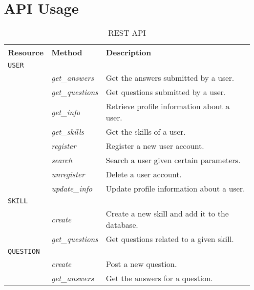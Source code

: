 \chapter{API Usage}

\begin{table}
	\caption{REST API}\label{table:rest_api}
	
	\begin{center}
		\begin{tabular}{p{70px} | p{70px} | p{210px}}
				\hline
				\hline
				\textbf{Resource} 		& \textbf{Method}					&	\textbf{Description} 	\\
				\hline
				\hline
				\texttt{USER}					&	\\
				\hline
															& \emph{get\_answers}			& Get the answers submitted by a user. \\
															& \emph{get\_questions}		& Get questions submitted by a user. \\
															& \emph{get\_info}				&	Retrieve profile information about a user.	\\
															& \emph{get\_skills}			& Get the skills of a user. \\
															& \emph{register}					&	Register a new user account. \\
															& \emph{search}						&	Search a user given certain parameters. \\
															& \emph{unregister}				&	Delete a user account. \\
															& \emph{update\_info}			& Update profile information about a user. \\
				\hline
				\texttt{SKILL}				& 												& \\
				\hline
															& \emph{create}						& Create a new skill and add it to the database. \\
															& \emph{get\_questions}		& Get questions related to a given skill. \\
				\hline
				\texttt{QUESTION}			& 												& \\
				\hline
															& \emph{create}						& Post a new question. \\
															& \emph{get\_answers}			& Get the answers for a question. \\

\end{tabular}
\end{center}
\end{table}
